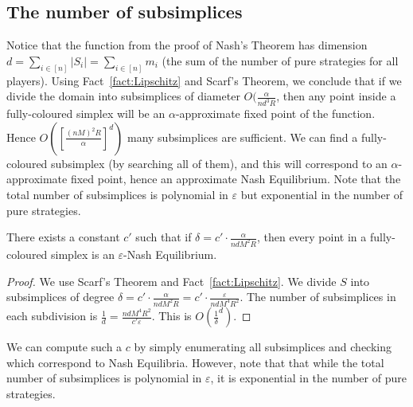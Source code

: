 \subsection{The number of subsimplices}
Notice that the function from the proof of Nash's Theorem has dimension $d =
\sum_{i \in [n]} |S_i| = \sum_{i \in [n]} m_i$ (the sum of the number of pure
strategies for all players). Using Fact~\ref{fact:Lipschitz} and Scarf's
Theorem, we conclude that if we divide the domain into subsimplices of diameter
$O(\frac{\alpha}{nd^3R}$, then any point inside a fully-coloured simplex will
be an $\alpha$-approximate fixed point of the function. Hence $O([ \frac{(nM)^2
R}{\alpha} ]^d)$ many subsimplices are sufficient. We can find a fully-coloured
subsimplex (by searching all of them), and this will correspond to an
$\alpha$-approximate fixed point, hence an approximate Nash Equilibrium. Note
that the total number of subsimplices is polynomial in $\varepsilon$ but
exponential in the number of pure strategies.

\begin{corollary}
	There exists a constant $c'$ such that if $\delta = c' \cdot
	\frac{\alpha}{ndM^2R}$, then every point in a fully-coloured simplex is
	an $\varepsilon$-Nash Equilibrium.
\end{corollary}
\begin{proof}
	We use Scarf's Theorem and Fact~\ref{fact:Lipschitz}. We divide $S$ into
	subsimplices of degree $\delta = c' \cdot \frac{\alpha}{ndM^2R} = c' \cdot
	\frac{\varepsilon}{ndM^4R^2}$. The number of subsimplices in each
	subdivision is $\frac{1}{d} = \frac{ndM^4R^2}{c' \varepsilon}$. This is
	$O(\frac{1}{\delta}^d)$.
\end{proof}

We can compute such a $c$ by simply enumerating all subsimplices and checking
which correspond to Nash Equilibria. However, note that that while the total
number of subsimplices is polynomial in $\varepsilon$, it is exponential in the
number of pure strategies.
